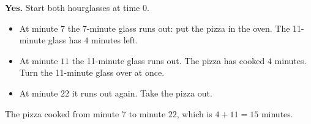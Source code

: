 \textbf{Yes.} Start both hourglasses at time $0$.
\begin{itemize}
\item At minute $7$ the 7-minute glass runs out: put the pizza in the oven. The 11-minute glass has $4$ minutes left.
\item At minute $11$ the 11-minute glass runs out. The pizza has cooked $4$ minutes. Turn the 11-minute glass over at once.
\item At minute $22$ it runs out again. Take the pizza out.
\end{itemize}
The pizza cooked from minute $7$ to minute $22$, which is $4+11=\boxed{15}$ minutes.
